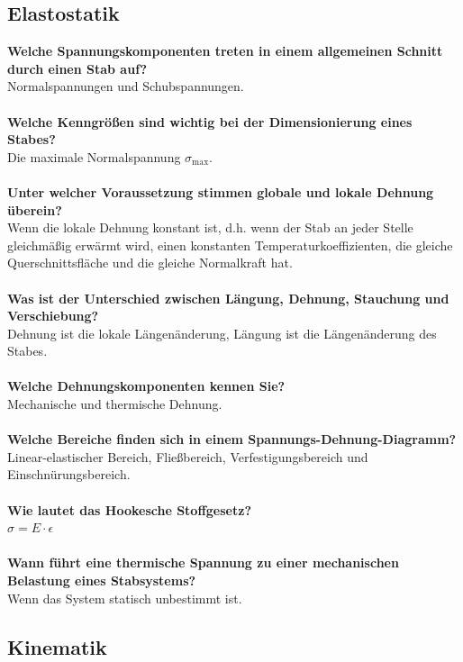 \documentclass[a4paper,twocolumn,10pt]{article}
\begin{document}
\subsection{Elastostatik}
\textbf{Welche Spannungskomponenten treten in einem allgemeinen Schnitt durch einen Stab auf?}\\
Normalspannungen und Schubspannungen.\\\\
\textbf{Welche Kenngrößen sind wichtig bei der Dimensionierung eines Stabes?}\\
Die maximale Normalspannung $\sigma_{\text{max}}$.\\\\
\textbf{Unter welcher Voraussetzung stimmen globale und lokale Dehnung überein?}\\
Wenn die lokale Dehnung konstant ist, d.h. wenn der Stab an jeder Stelle gleichmäßig erwärmt wird, einen konstanten Temperaturkoeffizienten, die gleiche Querschnittsfläche und die gleiche Normalkraft hat.\\\\
\textbf{Was ist der Unterschied zwischen Längung, Dehnung, Stauchung und Verschiebung?}\\
Dehnung ist die lokale Längenänderung, Längung ist die Längenänderung des Stabes.\\\\
\textbf{Welche Dehnungskomponenten kennen Sie?}\\
Mechanische und thermische Dehnung.\\\\
\textbf{Welche Bereiche finden sich in einem Spannungs-Dehnung-Diagramm?}\\
Linear-elastischer Bereich, Fließbereich, Verfestigungsbereich und Einschnürungsbereich.\\\\
\textbf{Wie lautet das Hookesche Stoffgesetz?}\\
$\sigma=E\cdot \epsilon$\\\\
\textbf{Wann führt eine thermische Spannung zu einer mechanischen Belastung eines Stabsystems?}\\
Wenn das System statisch unbestimmt ist.

\subsection{Kinematik}
\end{document}

